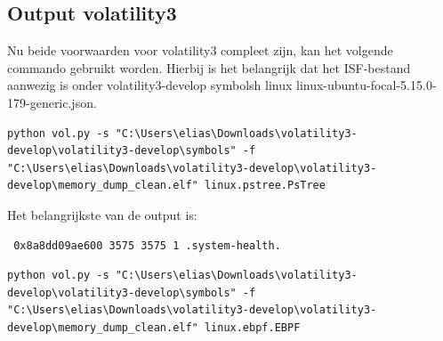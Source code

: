 \subsection{Output volatility3}
Nu beide voorwaarden voor volatility3 compleet zijn, kan het volgende commando gebruikt worden.
Hierbij is het belangrijk dat het ISF-bestand aanwezig is onder {volatility3-develop symbolsh linux linux-ubuntu-focal-5.15.0-179-generic.json}.

\begin{verbatim}
python vol.py -s "C:\Users\elias\Downloads\volatility3-develop\volatility3-develop\symbols" -f "C:\Users\elias\Downloads\volatility3-develop\volatility3-develop\memory_dump_clean.elf" linux.pstree.PsTree
\end{verbatim}

Het belangrijkste van de output is: \begin{verbatim} 0x8a8dd09ae600 3575 3575 1 .system-health. \end{verbatim} 

\begin{verbatim}
python vol.py -s "C:\Users\elias\Downloads\volatility3-develop\volatility3-develop\symbols" -f "C:\Users\elias\Downloads\volatility3-develop\volatility3-develop\memory_dump_clean.elf" linux.ebpf.EBPF
\end{verbatim}


